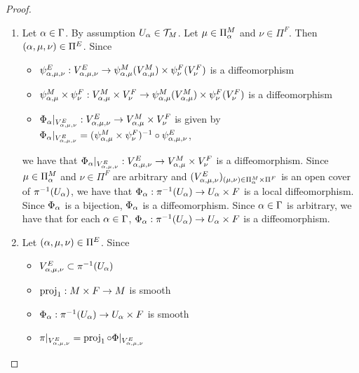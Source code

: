\documentclass{book}
\begin{document}
\begin{proof}
\begin{enumerate}
			is smooth. Since $(\al_1, \mu_1, \nu_1), (\al_2, \mu_2, \nu_2) \in \Pi^E$ are arbitrary, we have that $(V^E_{\al, \mu, \nu}, \psi^E_{\al, \mu, \nu})_{(\al, \mu, \nu) \in \Pi^E}$ is a smooth atlas on $E$.  implies that there exists a unique smooth structure $\MA_E$ on $E$ such that  $(E, \MA_E)$ is an $n+k$-dimensional smooth manifold. 
			\item Let $\alpha \in \Gamma$. By assumption $U_{\alpha} \in \mathcal{T}_M$. Let $\mu \in \Pi^M_{\alpha}$ and $\nu \in \Pi^F$. Then $(\alpha, \mu, \nu) \in \Pi^E$. Since 
			\begin{itemize}
				\item $\psi^E_{\alpha, \mu, \nu}: V^E_{\alpha, \mu, \nu} \rightarrow \psi^M_{\alpha, \mu}(V^M_{\alpha, \mu}) \times \psi^F_{\nu}(V^F_{\nu})$ is a diffeomorphism
				\item $\psi^M_{\alpha, \mu} \times \psi^F_{\nu}: V^M_{\alpha, \mu} \times V^F_{\nu} \rightarrow \psi^M_{\alpha, \mu}(V^M_{\alpha, \mu}) \times \psi^F_{\nu}(V^F_{\nu})$ is a diffeomorphism  
				\item $\Phi_{\alpha}|_{V^E_{\alpha, \mu, \nu}}: V^E_{\alpha, \mu, \nu} \rightarrow V^M_{\alpha, \mu} \times V^F_{\nu}$ is given by 
				$\Phi_{\alpha}|_{V^E_{\alpha, \mu, \nu}} =  (\psi^M_{\alpha, \mu} \times \psi^F_{\nu})^{-1} \circ \psi^E_{\alpha, \mu, \nu}$,
			\end{itemize}
			we have that $\Phi_{\alpha}|_{V^E_{\alpha, \mu, \nu}}: V^E_{\alpha, \mu, \nu} \rightarrow V^M_{\alpha, \mu} \times V^F_{\nu}$ is a diffeomorphism. Since $\mu \in \Pi^M_{\alpha}$ and $\nu \in \Pi^F$ are arbitrary and $(V^E_{\alpha, \mu, \nu})_{(\mu, \nu) \in \Pi^M_{\alpha} \times \Pi^F}$ is an open cover of $\pi^{-1}(U_{\alpha})$, we have that $\Phi_{\alpha}: \pi^{-1}(U_{\alpha}) \rightarrow U_{\alpha} \times F$ is a local diffeomorphism. Since $\Phi_{\alpha}$ is a bijection, $\Phi_{\alpha}$ is a diffeomorphism. Since $\alpha \in \Gamma$ is arbitrary, we have that for each $\alpha \in \Gamma$, $\Phi_{\alpha}: \pi^{-1}(U_{\alpha}) \rightarrow U_{\alpha} \times F$ is a diffeomorphism.
			\item Let $(\alpha, \mu, \nu) \in \Pi^E$. Since 
			\begin{itemize}
				\item $V^E_{\alpha, \mu, \nu} \subset \pi^{-1}(U_{\alpha})$
				\item $\operatorname{\text{proj}}_1: M \times F \rightarrow M$ is smooth
				\item $\Phi_{\alpha}: \pi^{-1}(U_{\alpha}) \rightarrow U_{\alpha} \times F$ is smooth
				\item $\pi|_{V^E_{\alpha, \mu, \nu}} = \operatorname{\text{proj}}_1 \circ \Phi|_{V^E_{\alpha, \mu, \nu}}$

\end{itemize}
\end{enumerate}
\end{proof}
\end{document}
